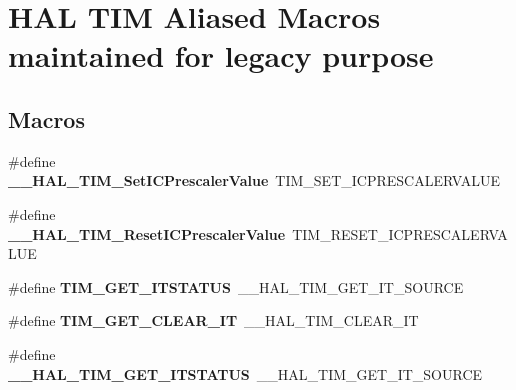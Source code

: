\hypertarget{group___h_a_l___t_i_m___aliased___macros}{}\section{H\+AL T\+IM Aliased Macros maintained for legacy purpose}
\label{group___h_a_l___t_i_m___aliased___macros}
\subsection*{Macros}
\begin{DoxyCompactItemize}
\item 
\#define {\bfseries \+\_\+\+\_\+\+H\+A\+L\+\_\+\+T\+I\+M\+\_\+\+Set\+I\+C\+Prescaler\+Value}~T\+I\+M\+\_\+\+S\+E\+T\+\_\+\+I\+C\+P\+R\+E\+S\+C\+A\+L\+E\+R\+V\+A\+L\+UE\hypertarget{group___h_a_l___t_i_m___aliased___macros_ga1f487f25516b3fd87b864f5be8229b7e}{}\label{group___h_a_l___t_i_m___aliased___macros_ga1f487f25516b3fd87b864f5be8229b7e}

\item 
\#define {\bfseries \+\_\+\+\_\+\+H\+A\+L\+\_\+\+T\+I\+M\+\_\+\+Reset\+I\+C\+Prescaler\+Value}~T\+I\+M\+\_\+\+R\+E\+S\+E\+T\+\_\+\+I\+C\+P\+R\+E\+S\+C\+A\+L\+E\+R\+V\+A\+L\+UE\hypertarget{group___h_a_l___t_i_m___aliased___macros_gac171a25ce55eafe62671d40d7397d721}{}\label{group___h_a_l___t_i_m___aliased___macros_gac171a25ce55eafe62671d40d7397d721}

\item 
\#define {\bfseries T\+I\+M\+\_\+\+G\+E\+T\+\_\+\+I\+T\+S\+T\+A\+T\+US}~\+\_\+\+\_\+\+H\+A\+L\+\_\+\+T\+I\+M\+\_\+\+G\+E\+T\+\_\+\+I\+T\+\_\+\+S\+O\+U\+R\+CE\hypertarget{group___h_a_l___t_i_m___aliased___macros_ga1dd7eae80b853d3526091193e81b4731}{}\label{group___h_a_l___t_i_m___aliased___macros_ga1dd7eae80b853d3526091193e81b4731}

\item 
\#define {\bfseries T\+I\+M\+\_\+\+G\+E\+T\+\_\+\+C\+L\+E\+A\+R\+\_\+\+IT}~\+\_\+\+\_\+\+H\+A\+L\+\_\+\+T\+I\+M\+\_\+\+C\+L\+E\+A\+R\+\_\+\+IT\hypertarget{group___h_a_l___t_i_m___aliased___macros_gadd580b2357a85c03653006349721a36e}{}\label{group___h_a_l___t_i_m___aliased___macros_gadd580b2357a85c03653006349721a36e}

\item 
\#define {\bfseries \+\_\+\+\_\+\+H\+A\+L\+\_\+\+T\+I\+M\+\_\+\+G\+E\+T\+\_\+\+I\+T\+S\+T\+A\+T\+US}~\+\_\+\+\_\+\+H\+A\+L\+\_\+\+T\+I\+M\+\_\+\+G\+E\+T\+\_\+\+I\+T\+\_\+\+S\+O\+U\+R\+CE\hypertarget{group___h_a_l___t_i_m___aliased___macros_ga5b35f7cd15ac31c7b1a9596ac8521f36}{}\label{group___h_a_l___t_i_m___aliased___macros_ga5b35f7cd15ac31c7b1a9596ac8521f36}


\end{DoxyCompactItemize}
